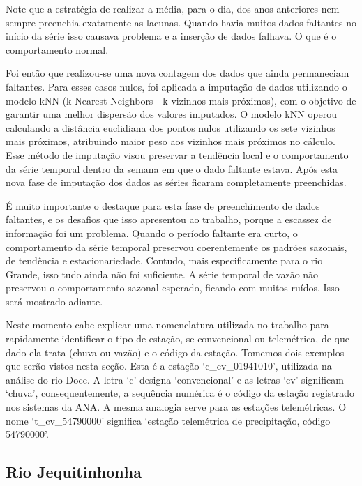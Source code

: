 Note que a estratégia de realizar a média, para o dia, dos anos anteriores nem sempre preenchia exatamente as lacunas. Quando havia muitos dados faltantes no início da série isso causava problema e a inserção de dados falhava. O que é o comportamento normal.

Foi então que realizou-se uma nova contagem dos dados que ainda permaneciam faltantes. Para esses casos nulos, foi aplicada a imputação de dados utilizando o modelo kNN (k-Nearest Neighbors - k-vizinhos mais próximos), com o objetivo de garantir uma melhor dispersão dos valores imputados. O modelo kNN operou calculando a distância euclidiana dos pontos nulos utilizando os sete vizinhos mais próximos, atribuindo maior peso aos vizinhos mais próximos no cálculo. Esse método de imputação visou preservar a tendência local e o comportamento da série temporal dentro da semana em que o dado faltante estava. Após esta nova fase de imputação dos dados as séries ficaram completamente preenchidas.

É muito importante o destaque para esta fase de preenchimento de dados faltantes, e os desafios que isso apresentou ao trabalho, porque a escassez de informação foi um problema. Quando o período faltante era curto, o comportamento da série temporal preservou coerentemente os padrões sazonais, de tendência e estacionariedade. Contudo, mais especificamente para o rio Grande, isso tudo ainda não foi suficiente. A série temporal de vazão não preservou o comportamento sazonal esperado, ficando com muitos ruídos. Isso será mostrado adiante.

Neste momento cabe explicar uma nomenclatura utilizada no trabalho para rapidamente identificar o tipo de estação, se convencional ou telemétrica, de que dado ela trata (chuva ou vazão) e o código da estação. Tomemos dois exemplos que serão vistos nesta seção. Esta é a estação `c\_cv\_01941010', utilizada na análise do rio Doce. A letra `c' designa `convencional' e as letras `cv' significam `chuva', consequentemente, a sequência numérica é o código da estação registrado nos sistemas da ANA. A mesma analogia serve para as estações telemétricas. O nome `t\_cv\_54790000' significa `estação telemétrica de precipitação, código 54790000'.

\subsection{Rio Jequitinhonha}

